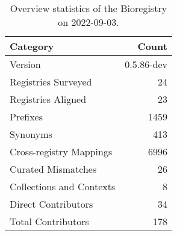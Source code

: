 \begin{table}
\centering
\caption{Overview statistics of the Bioregistry on 2022-09-03.}
\label{tab:bioregistry-summary}
\begin{tabular}{lr}
\toprule
                Category &      Count \\
\midrule
                 Version & 0.5.86-dev \\
     Registries Surveyed &         24 \\
      Registries Aligned &         23 \\
                Prefixes &       1459 \\
                Synonyms &        413 \\
 Cross-registry Mappings &       6996 \\
      Curated Mismatches &         26 \\
Collections and Contexts &          8 \\
     Direct Contributors &         34 \\
      Total Contributors &        178 \\
\bottomrule
\end{tabular}
\end{table}

